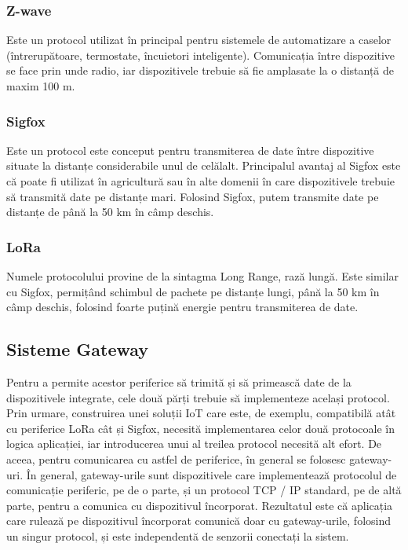 \subsubsection{Z-wave}
\label{sec:embed:bus:wireless:zwave}

Este un protocol utilizat în principal
pentru sistemele de automatizare a caselor (întrerupătoare, termostate,
încuietori inteligente). Comunicația între dispozitive se face prin unde radio,
iar dispozitivele trebuie să fie amplasate la o distanță de maxim 100 m.

\subsubsection{Sigfox}
\label{sec:embed:bus:wireless:sigfox}

Este un protocol este conceput
pentru transmiterea de date între dispozitive situate la distanțe considerabile
unul de celălalt. Principalul avantaj al Sigfox este că poate fi utilizat în
agricultură sau în alte domenii în care dispozitivele trebuie să transmită date
pe distanțe mari. Folosind Sigfox, putem transmite date pe distanțe de până la
50 km în câmp deschis.

\subsubsection{LoRa}
\label{sec:embed:bus:wireless:lora}

Numele protocolului provine de la sintagma Long Range, rază lungă. Este similar cu
Sigfox, permițând schimbul de pachete pe distanțe lungi, până la 50 km în câmp
deschis, folosind foarte puțină energie pentru transmiterea de date.

\subsection{Sisteme Gateway}
\label{sec:embed:bus:gateway}

Pentru a permite acestor periferice să trimită și să primească date de la
dispozitivele integrate, cele două părți trebuie să implementeze același
protocol. Prin urmare, construirea unei soluții IoT care este, de exemplu,
compatibilă atât cu periferice LoRa cât și Sigfox, necesită implementarea celor
două protocoale în logica aplicației, iar introducerea unui al treilea protocol
necesită alt efort. De aceea, pentru comunicarea cu astfel de
periferice, în general se folosesc gateway-uri. În general, gateway-urile sunt
dispozitivele care implementează protocolul de comunicație periferic, pe de o
parte, și un protocol TCP / IP standard, pe de altă parte, pentru a comunica cu
dispozitivul încorporat. Rezultatul este că aplicația care rulează pe
dispozitivul încorporat comunică doar cu gateway-urile, folosind un singur
protocol, și este independentă de senzorii conectați la sistem.

